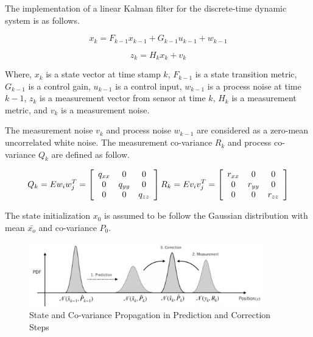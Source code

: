 The implementation of a linear Kalman filter for the discrete-time dynamic system is as follows.

\begin{equation}
x_{k}=F_{k-1} x_{k-1}+G_{k-1} u_{k-1}+w_{k-1}
\end{equation}

\begin{equation}
z_{k}=H_{k} x_{k}+v_{k}
\end{equation}

Where, $x_{k}$ is a state vector at time stamp $k$, $F_{k-1}$ is a state transition metric, $G_{k-1}$ is a control gain, $u_{k-1}$ is a control input, $w_{k-1}$ is a process noise at time $k-1$, $z_{k}$ is a measurement vector from sensor at time $k$,  $H_{k}$ is a measurement metric, and $v_{k}$ is a measurement noise.

The measurement noise $v_{k}$ and process noise $w_{k-1}$ are considered as a zero-mean uncorrelated white noise. The measurement co-variance $R_{k}$ and process co-variance $Q_{k}$ are defined as follow. 

\begin{equation}
    Q_{k} = E{w_{i} w_{j}^T} = 
    \left[\begin{array}{ccc}
    q_{xx} & 0 & 0 \\
    0 & q_{yy} & 0 \\
    0 & 0 & q_{zz}
    \end{array}\right] \\
    R_{k} = E{v_{i} v_{j}^T} =
    \left[\begin{array}{ccc}
    r_{xx} & 0 & 0 \\
    0 & r_{yy} & 0 \\
    0 & 0 & r_{zz}
    \end{array}\right]
\end{equation}

The state initialization $x_{0}$ is assumed to be follow the Gaussian distribution with mean $\bar{x_{o}}$ and co-variance $P_{0}$.

\begin{figure}
    \centering
    \includegraphics[width=0.9\textwidth]{Images/KF.png}
    \caption{State and Co-variance Propagation in Prediction and Correction Steps \cite{coursera2}}
    \label{KF}
\end{figure}

